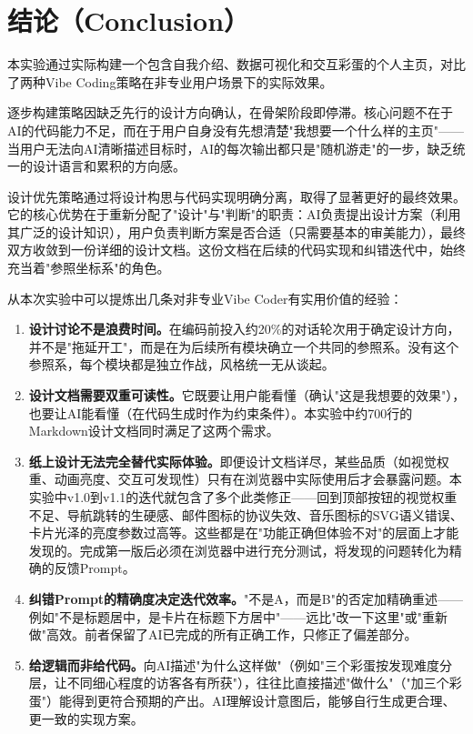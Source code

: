 \section{结论（Conclusion）}

本实验通过实际构建一个包含自我介绍、数据可视化和交互彩蛋的个人主页，对比了两种Vibe Coding策略在非专业用户场景下的实际效果。

逐步构建策略因缺乏先行的设计方向确认，在骨架阶段即停滞。核心问题不在于AI的代码能力不足，而在于用户自身没有先想清楚"我想要一个什么样的主页"——当用户无法向AI清晰描述目标时，AI的每次输出都只是"随机游走"的一步，缺乏统一的设计语言和累积的方向感。

设计优先策略通过将设计构思与代码实现明确分离，取得了显著更好的最终效果。它的核心优势在于重新分配了"设计"与"判断"的职责：AI负责提出设计方案（利用其广泛的设计知识），用户负责判断方案是否合适（只需要基本的审美能力），最终双方收敛到一份详细的设计文档。这份文档在后续的代码实现和纠错迭代中，始终充当着"参照坐标系"的角色。

从本次实验中可以提炼出几条对非专业Vibe Coder有实用价值的经验：

\begin{enumerate}
    \item \textbf{设计讨论不是浪费时间。}在编码前投入约20\%的对话轮次用于确定设计方向，并不是"拖延开工"，而是在为后续所有模块确立一个共同的参照系。没有这个参照系，每个模块都是独立作战，风格统一无从谈起。

    \item \textbf{设计文档需要双重可读性。}它既要让用户能看懂（确认"这是我想要的效果"），也要让AI能看懂（在代码生成时作为约束条件）。本实验中约700行的Markdown设计文档同时满足了这两个需求。

    \item \textbf{纸上设计无法完全替代实际体验。}即便设计文档详尽，某些品质（如视觉权重、动画亮度、交互可发现性）只有在浏览器中实际使用后才会暴露问题。本实验中v1.0到v1.1的迭代就包含了多个此类修正——回到顶部按钮的视觉权重不足、导航跳转的生硬感、邮件图标的协议失效、音乐图标的SVG语义错误、卡片光泽的亮度参数过高等。这些都是在"功能正确但体验不对"的层面上才能发现的。完成第一版后必须在浏览器中进行充分测试，将发现的问题转化为精确的反馈Prompt。

    \item \textbf{纠错Prompt的精确度决定迭代效率。}"不是A，而是B"的否定加精确重述——例如"不是标题居中，是卡片在标题下方居中"——远比"改一下这里"或"重新做"高效。前者保留了AI已完成的所有正确工作，只修正了偏差部分。

    \item \textbf{给逻辑而非给代码。}向AI描述"为什么这样做"（例如"三个彩蛋按发现难度分层，让不同细心程度的访客各有所获"），往往比直接描述"做什么"（"加三个彩蛋"）能得到更符合预期的产出。AI理解设计意图后，能够自行生成更合理、更一致的实现方案。
\end{enumerate}

